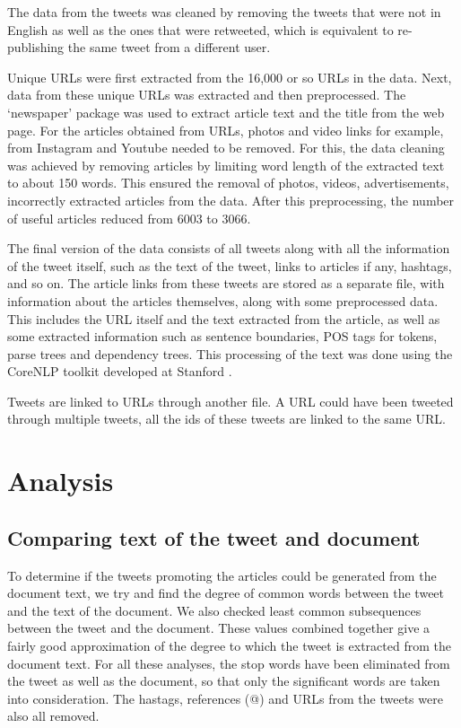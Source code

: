 \documentclass[11pt]{article}
\begin{document}
The data from the tweets was cleaned by removing the tweets that were not in English as well as the ones that were retweeted, which is equivalent to re-publishing the same tweet from a different user. 

Unique URLs were first extracted from the 16,000 or so URLs in the data. Next, data from these unique URLs was extracted and then preprocessed. The ‘newspaper’ package was used to extract article text and the title from the web page. For the articles obtained from URLs, photos and video links for example, from Instagram and Youtube needed to be removed. For this, the data cleaning was achieved by removing articles by limiting word length of the extracted text to about 150 words. This ensured the removal of photos, videos, advertisements, incorrectly extracted articles from the data.  After this preprocessing, the number of useful articles reduced from 6003 to 3066.

The final version of the data consists of all tweets along with all the information of the tweet itself, such as the text of the tweet, links to articles if any, hashtags, and so on. The article links from these tweets are stored as a separate file, with information about the articles themselves, along with some preprocessed data. This includes the URL itself and the text extracted from the article, as well as some extracted information such as sentence boundaries, POS tags for tokens, parse trees and dependency trees. This processing of the text was done using the CoreNLP toolkit developed at Stanford .

Tweets are linked to URLs through another file. A URL could have been tweeted through multiple tweets, all the ids of these tweets are linked to the same URL. 


\section{Analysis}
\subsection{Comparing text of the tweet and document}

To determine if the tweets promoting the articles could be generated from the document text, we try and find the degree of common words between the tweet and the text of the document. We also checked least common subsequences between the tweet and the document. These values combined together give a fairly good approximation of the degree to which the tweet is extracted from the document text. For all these analyses, the stop words have been eliminated from the tweet as well as the document, so that only the significant words are taken into consideration. The hastags, references (@) and URLs from the tweets were also all removed.
\end{document}
